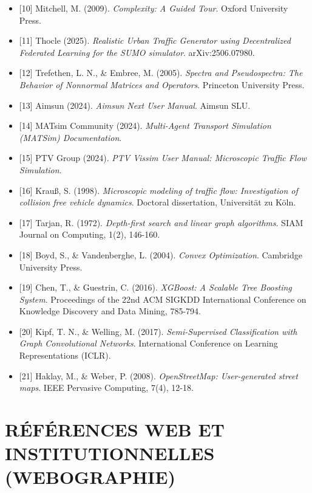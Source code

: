 \documentclass[10pt, a4paper]{article}
\begin{document}
\begin{itemize}
{  Differenzengleichungen, die partielle Differentialgleichungen
  approximieren}. BIT Numerical Mathematics, 2(3), 153-181.
\item
  {[}10{]} Mitchell, M. (2009). \emph{Complexity: A Guided Tour}. Oxford
  University Press.
\item
  {[}11{]} Thocle (2025). \emph{Realistic Urban Traffic Generator using
  Decentralized Federated Learning for the SUMO simulator}.
  arXiv:2506.07980.
\item
  {[}12{]} Trefethen, L. N., \& Embree, M. (2005). \emph{Spectra and
  Pseudospectra: The Behavior of Nonnormal Matrices and Operators}.
  Princeton University Press.
\item
  {[}13{]} Aimsun (2024). \emph{Aimsun Next User Manual}. Aimsun SLU.
\item
  {[}14{]} MATsim Community (2024). \emph{Multi-Agent Transport
  Simulation (MATSim) Documentation}.
\item
  {[}15{]} PTV Group (2024). \emph{PTV Vissim User Manual: Microscopic
  Traffic Flow Simulation}.
\item
  {[}16{]} Krauß, S. (1998). \emph{Microscopic modeling of traffic flow:
  Investigation of collision free vehicle dynamics}. Doctoral
  dissertation, Universität zu Köln.
\item
  {[}17{]} Tarjan, R. (1972). \emph{Depth-first search and linear graph
  algorithms}. SIAM Journal on Computing, 1(2), 146-160.
\item
  {[}18{]} Boyd, S., \& Vandenberghe, L. (2004). \emph{Convex
  Optimization}. Cambridge University Press.
\item
  {[}19{]} Chen, T., \& Guestrin, C. (2016). \emph{XGBoost: A Scalable
  Tree Boosting System}. Proceedings of the 22nd ACM SIGKDD
  International Conference on Knowledge Discovery and Data Mining,
  785-794.
\item
  {[}20{]} Kipf, T. N., \& Welling, M. (2017). \emph{Semi-Supervised
  Classification with Graph Convolutional Networks}. International
  Conference on Learning Representations (ICLR).
\item
  {[}21{]} Haklay, M., \& Weber, P. (2008). \emph{OpenStreetMap:
  User-generated street maps}. IEEE Pervasive Computing, 7(4), 12-18.
\end{itemize}

\newpage

\section{RÉFÉRENCES WEB ET INSTITUTIONNELLES
(WEBOGRAPHIE)}\label{ruxe9fuxe9rences-web-et-institutionnelles-webographie}
\end{document}
